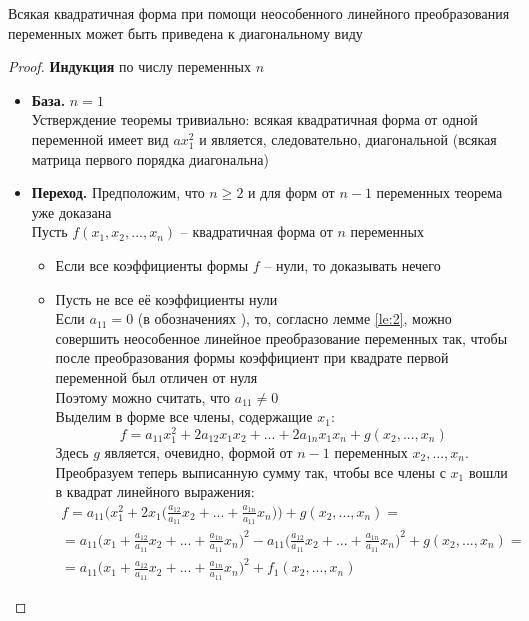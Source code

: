 \begin{theorem}[Лагранжа]
	Всякая квадратичная форма при помощи неособенного линейного преобразования переменных может быть приведена к диагональному виду
\end{theorem}

\begin{proof}
	\textbf{Индукция} по числу переменных $ n $
	\begin{itemize}
		\item \textbf{База.} $ n = 1 $ \\
		Устверждение теоремы тривиально: всякая квадратичная форма от одной переменной имеет вид $ ax_1^2 $ и является, следовательно, диагональной (всякая матрица первого порядка диагональна)
		\item \textbf{Переход.} Предположим, что $ n \ge 2 $ и  для форм от $ n - 1 $ переменных теорема уже доказана \\
		Пусть $ f(x_1, x_2, ..., x_n) $ -- квадратичная форма от $ n $ переменных
		\begin{itemize}
			\item Если все коэффициенты формы $ f $ -- нули, то доказывать нечего
			\item Пусть не все её коэффициенты нули \\
			Если $ a_{11} = 0 $ (в обозначениях ), то, согласно лемме \ref{le:2}, можно совершить неособенное линейное преобразование переменных так, чтобы после преобразования формы коэффициент при квадрате первой переменной был отличен от нуля \\
			Поэтому можно считать, что $ a_{11} \ne 0 $ \\
			Выделим в форме  все члены, содержащие $ x_1 $:
			$$ f = a_{11}x_1^2 + 2a_{12}x_1x_2 + ... + 2a_{1n}x_1x_n + g(x_2, ..., x_n) $$
			Здесь $ g $ является, очевидно, формой от $ n - 1 $ переменных $ x_2, ..., x_n $. Преобразуем теперь выписанную сумму так, чтобы все члены с $ x_1 $ вошли в квадрат линейного выражения:
			\begin{multline*}
				f = a_{11} \bigg( x_1^2 + 2x_1 \big( \frac{a_{12}}{a_{11}}x_2 + ... + \frac{a_{1n}}{a_{11}}x_n \big) \bigg) + g(x_2, ..., x_n) = \\ = a_{11} \bigg( x_1 + \frac{a_{12}}{a_{11}}x_2 + ... + \frac{a_{1n}}{a_{11}}x_n \bigg)^2 - a_{11} \bigg( \frac{a_{12}}{a_{11}}x_2 + ... + \frac{a_{1n}}{a_{11}}x_n \bigg)^2 + g(x_2, ..., x_n) = \\ = a_{11} \bigg( x_1 + \frac{a_{12}}{a_{11}}x_2 + ... + \frac{a_{1n}}{a_{11}}x_n \bigg)^2 + f_1(x_2, ..., x_n)

\end{multline*}
\end{itemize}
\end{itemize}
\end{proof}
